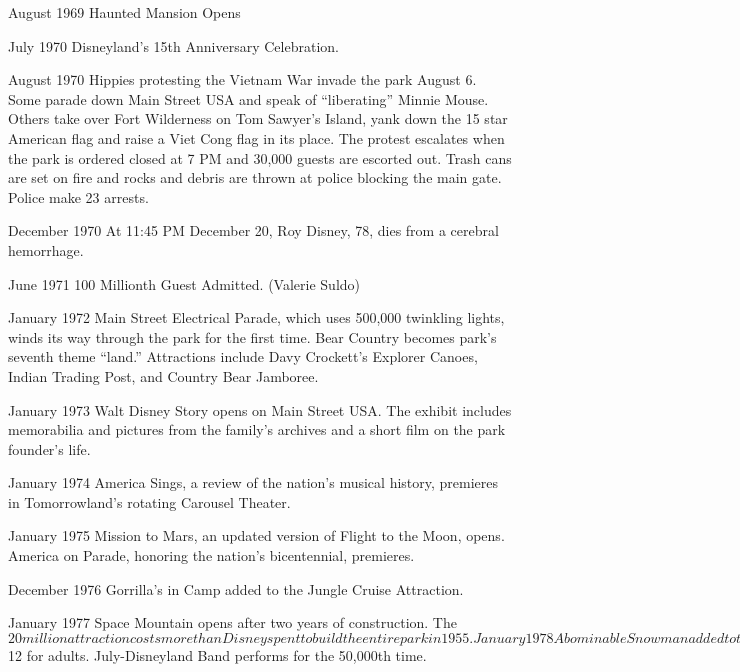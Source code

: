 August 1969
Haunted Mansion Opens

July 1970
Disneyland’s 15th Anniversary Celebration.

August 1970
Hippies protesting the Vietnam War invade the park August 6. Some parade down Main Street USA and speak of “liberating” Minnie Mouse.  Others take over Fort Wilderness on Tom Sawyer’s Island, yank down the 15 star American flag and raise a Viet Cong flag in its place.  The protest escalates when the park is ordered closed at 7 PM and 30,000 guests are escorted out.  Trash cans are set on fire and rocks and debris are thrown at police blocking the main gate.  Police make 23 arrests.

December 1970
At 11:45 PM December 20, Roy Disney, 78, dies from a cerebral hemorrhage.

June 1971
100 Millionth Guest Admitted. (Valerie Suldo)

January 1972
Main Street Electrical Parade, which uses 500,000 twinkling lights, winds its way through the park for the first time.  Bear Country becomes park’s seventh theme “land.”  Attractions include Davy Crockett’s Explorer Canoes, Indian Trading Post, and Country Bear Jamboree.

January 1973
Walt Disney Story opens on Main Street USA.  The exhibit includes memorabilia and pictures from the family’s archives and a short film on the park founder’s life.

January 1974
America Sings, a review of the nation’s musical history, premieres in Tomorrowland’s rotating Carousel Theater.

January 1975
Mission to Mars, an updated version of Flight to the Moon, opens. America on Parade, honoring the nation’s bicentennial, premieres.

December 1976
Gorrilla’s in Camp added to the Jungle Cruise Attraction.

January 1977
Space Mountain opens after two years of construction. The $20 million attraction costs more than Disney spent to build the entire park in 1955.

January 1978
Abominable Snowman added to the Matterhorn, November. Mickey Mouse turns 50 with a November celebration attended by 91,762 guests.

January 1979
The two acre Big Thunder Mountain Railroad opens in Frontierland.

January 1982
The E ticket remains in the language but disappears from Disneyland.  The passport, good for admission and unlimited use of park’s attractions, is introduced at a cost of $12 for adults.  July-Disneyland Band performs for the 50,000th time.

